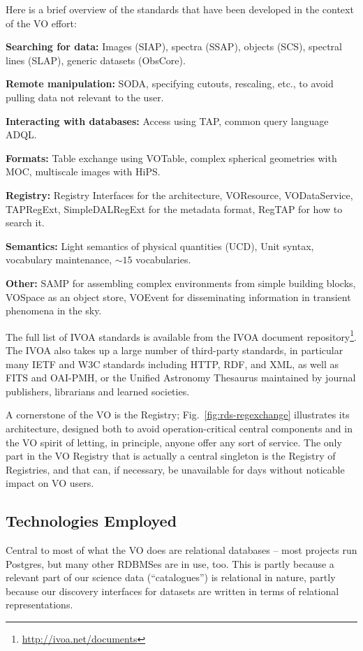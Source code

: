 Here is a brief overview of the standards that have been developed in
the context of the VO effort:

\textbf{Searching for data:} Images (SIAP), spectra (SSAP), objects
(SCS), spectral lines (SLAP), generic datasets (ObsCore).

\textbf{Remote manipulation:} SODA, specifying cutouts, rescaling, etc.,
to avoid pulling data not relevant to the user.

\textbf{Interacting with databases:} Access using TAP, common query
language ADQL.

\textbf{Formats:} Table exchange using VOTable, complex spherical
geometries with MOC, multiscale images with HiPS.

\textbf{Registry:} Registry Interfaces for the architecture, VOResource,
VODataService, TAPRegExt, SimpleDALRegExt for the metadata format,
RegTAP for how to search it.

\textbf{Semantics:} Light semantics of physical quantities (UCD), Unit
syntax, vocabulary maintenance, $\sim 15$ vocabularies.

\textbf{Other:} SAMP for assembling complex environments from simple
building blocks, VOSpace as an object store, VOEvent for disseminating
information in transient phenomena in the sky.

The full list of IVOA standards is available from the IVOA document
repository\footnote{\url{http://ivoa.net/documents}}.  The IVOA also
takes up a large number of third-party standards, in particular many
IETF and W3C standards including HTTP, RDF, and XML, as well as FITS and
OAI-PMH, or the Unified Astronomy Thesaurus maintained by journal
publishers, librarians and learned societies.

A cornerstone of the VO is the Registry; Fig.~\ref{fig:rds-regexchange}
illustrates its architecture, designed both to avoid operation-critical
central components and in the VO spirit of letting, in principle,
anyone offer any sort of service.  The only part in the VO Registry that
is actually a central singleton is the Registry of Registries, and that
can, if necessary, be unavailable for days without noticable impact on
VO users.

\subsection{Technologies Employed}

Central to most of what the VO does are relational databases -- most
projects run Postgres, but many other RDBMSes are in use, too.
This is partly because a relevant part of our science data
(``catalogues'') is relational in nature, partly because our discovery
interfaces for datasets are written in terms of relational
representations.

